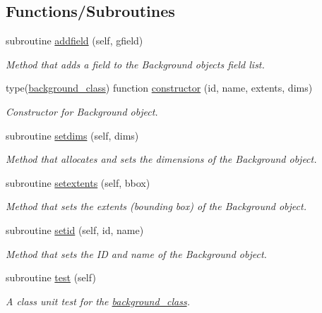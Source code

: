 \subsection*{Functions/\+Subroutines}
\begin{DoxyCompactItemize}
\item 
subroutine \mbox{\hyperlink{namespacebackground__mod_aa6ddc308698724f00ce1177ded5afc4c}{addfield}} (self, gfield)
\begin{DoxyCompactList}\small\item\em Method that adds a field to the Background object\textquotesingle{}s field list. \end{DoxyCompactList}\item 
type(\mbox{\hyperlink{structbackground__mod_1_1background__class}{background\+\_\+class}}) function \mbox{\hyperlink{namespacebackground__mod_ad0096fb6a5a11854fd70a7ce58dc3000}{constructor}} (id, name, extents, dims)
\begin{DoxyCompactList}\small\item\em Constructor for Background object. \end{DoxyCompactList}\item 
subroutine \mbox{\hyperlink{namespacebackground__mod_a06d96d4627391d74feb105a842a87dc0}{setdims}} (self, dims)
\begin{DoxyCompactList}\small\item\em Method that allocates and sets the dimensions of the Background object. \end{DoxyCompactList}\item 
subroutine \mbox{\hyperlink{namespacebackground__mod_ae8871564866fdd657a25f6a5a2256c33}{setextents}} (self, bbox)
\begin{DoxyCompactList}\small\item\em Method that sets the extents (bounding box) of the Background object. \end{DoxyCompactList}\item 
subroutine \mbox{\hyperlink{namespacebackground__mod_a4feaccf688558d8590ece4f09c65c977}{setid}} (self, id, name)
\begin{DoxyCompactList}\small\item\em Method that sets the ID and name of the Background object. \end{DoxyCompactList}\item 
subroutine \mbox{\hyperlink{namespacebackground__mod_a3cee95b9b5d3aae83df33334981f2b27}{test}} (self)
\begin{DoxyCompactList}\small\item\em A class \textquotesingle{}unit\textquotesingle{} test for the \mbox{\hyperlink{structbackground__mod_1_1background__class}{background\+\_\+class}}. \end{DoxyCompactList}\item 

\end{DoxyCompactItemize}
